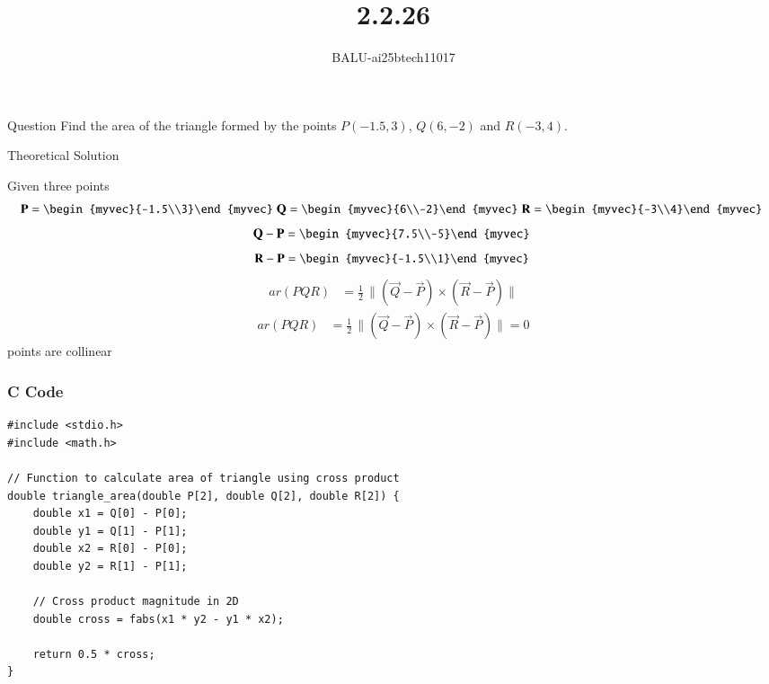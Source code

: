 \documentclass{beamer}
\title %
{2.2.26}
\author %
{BALU-ai25btech11017}
\begin{document}
\frame{\titlepage}
\begin{frame}{Question}
Find the area of the triangle formed by the points $P(-1.5,3)$, $Q(6,-2)$ and $R(-3,4)$.
\\ 
\end{frame}



\begin{frame}{Theoretical Solution}

Given three points\\
\begin{align}
  \vec{P}=\begin{myvec}{-1.5\\3}\end{myvec}\;
  \vec{Q}=\begin{myvec}{6\\-2}\end{myvec}\;
  \vec{R}=\begin{myvec}{-3\\4}\end{myvec}\
   \end{align}
   \begin{align}
 \vec{Q}-\vec{P}=\begin{myvec}{7.5\\-5}\end{myvec}\
\end{align}
\begin{align}
  \vec{R}-\vec{P}=\begin{myvec}{-1.5\\1}\end{myvec}\
\end{align}
\begin{align}
ar(PQR) &= \frac{1}{2} \, \|(\vec{Q} - \vec{P}) \times (\vec{R} - \vec{P}) \|
\end{align}
\begin{align}
ar(PQR) &= \frac{1}{2} \, \|(\vec{Q} - \vec{P}) \times (\vec{R} - \vec{P}) \|=0
\end{align}
points are collinear
\end{frame}
\begin{frame}[fragile]
    \frametitle{C Code}

    \begin{lstlisting}
#include <stdio.h>
#include <math.h>

// Function to calculate area of triangle using cross product
double triangle_area(double P[2], double Q[2], double R[2]) {
    double x1 = Q[0] - P[0];
    double y1 = Q[1] - P[1];
    double x2 = R[0] - P[0];
    double y2 = R[1] - P[1];
    
    // Cross product magnitude in 2D
    double cross = fabs(x1 * y2 - y1 * x2);
    
    return 0.5 * cross;
}



   

     \end{lstlisting}
\end{frame}
\end{document}
